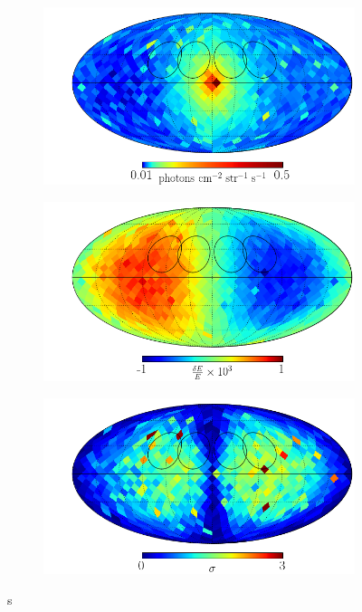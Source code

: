 \documentclass[aps,prl,10pt,twocolumn,superscriptaddress,showpacs]{revtex4-1}
\begin{document}
{\begin{figure}[h!]
\centering
\begin{subfigure}[b]{1.0\columnwidth}
	\includegraphics[width=\textwidth]{flux_map_374.png}
\end{subfigure}
\par\medskip
\begin{subfigure}[b]{1.0\columnwidth}
	\includegraphics[width=\textwidth]{line_map_374.png}
\end{subfigure}
\par\medskip
\begin{subfigure}[b]{1.0\columnwidth}
	\includegraphics[width=\textwidth]{sigma_map_374.png}
\end{subfigure}
\caption{s}
\label{fig:skymaps}
\end{figure}



}
\end{document}
